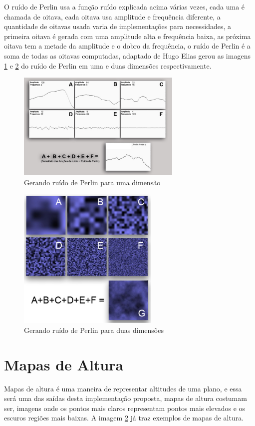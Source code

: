 O ruído de Perlin usa a função ruído explicada acima várias vezes, cada uma é chamada
de oitava, cada oitava usa amplitude e frequência diferente, a quantidade de oitavas
usada varia de implementações para necessidades, a primeira oitava é gerada com uma
amplitude alta e frequência baixa, as próxima oitava tem a metade da amplitude e 
o dobro da frequência, o ruído de Perlin é a soma de todas as oitavas computadas,
adaptado de Hugo Elias \cite{carli2012canion} gerou as imagens
\ref{fig:perlin1d} e \ref{fig:perlin2d} do ruído de Perlin em uma e duas
dimensões respectivamente.
\begin{figure}[H]
    \centering
    \includegraphics[width=0.7\textwidth]{figuras/perlin1d.png}
    \caption{Gerando ruído de Perlin para uma dimensão}
    \label{fig:perlin1d}
\end{figure}
\begin{figure}[H]
    \centering
    \includegraphics[width=0.6\textwidth]{figuras/perlin2d.png}
    \caption{Gerando ruído de Perlin para duas dimensões}
    \label{fig:perlin2d}
\end{figure}

\section{Mapas de Altura}
Mapas de altura é uma maneira de representar altitudes de uma plano, e essa
será uma das saídas desta implementação proposta, mapas de altura costumam ser, imagens
onde os pontos mais claros representam pontos mais elevados e os escuros regiões mais baixas.
A imagem \ref{fig:perlin2d} já traz exemplos de mapas de altura.

